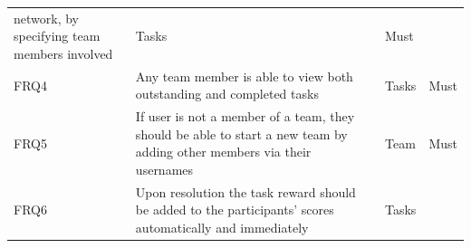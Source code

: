 \begin{longtable}[]{@{}llll@{}}
\begin{minipage}[t]{0.64\columnwidth}
network, by specifying team members involved\strut
\end{minipage} & \begin{minipage}[t]{0.12\columnwidth}\raggedright\strut
Tasks\strut
\end{minipage} & \begin{minipage}[t]{0.09\columnwidth}\raggedright\strut
Must\strut
\end{minipage}\tabularnewline
\begin{minipage}[t]{0.04\columnwidth}\raggedright\strut
FRQ4\strut
\end{minipage} & \begin{minipage}[t]{0.64\columnwidth}\raggedright\strut
Any team member is able to view both outstanding and completed
tasks\strut
\end{minipage} & \begin{minipage}[t]{0.12\columnwidth}\raggedright\strut
Tasks\strut
\end{minipage} & \begin{minipage}[t]{0.09\columnwidth}\raggedright\strut
Must\strut
\end{minipage}\tabularnewline
\begin{minipage}[t]{0.04\columnwidth}\raggedright\strut
FRQ5\strut
\end{minipage} & \begin{minipage}[t]{0.64\columnwidth}\raggedright\strut
If user is not a member of a team, they should be able to start a new
team by adding other members via their usernames\strut
\end{minipage} & \begin{minipage}[t]{0.12\columnwidth}\raggedright\strut
Team\strut
\end{minipage} & \begin{minipage}[t]{0.09\columnwidth}\raggedright\strut
Must\strut
\end{minipage}\tabularnewline
\begin{minipage}[t]{0.04\columnwidth}\raggedright\strut
FRQ6\strut
\end{minipage} & \begin{minipage}[t]{0.64\columnwidth}\raggedright\strut
Upon resolution the task reward should be added to the participants'
scores automatically and immediately\strut
\end{minipage} & \begin{minipage}[t]{0.12\columnwidth}\raggedright\strut
Tasks\strut
\end{minipage} & \begin{minipage}[t]{0.09\columnwidth}\raggedright\strut

\end{minipage}
\end{longtable}
